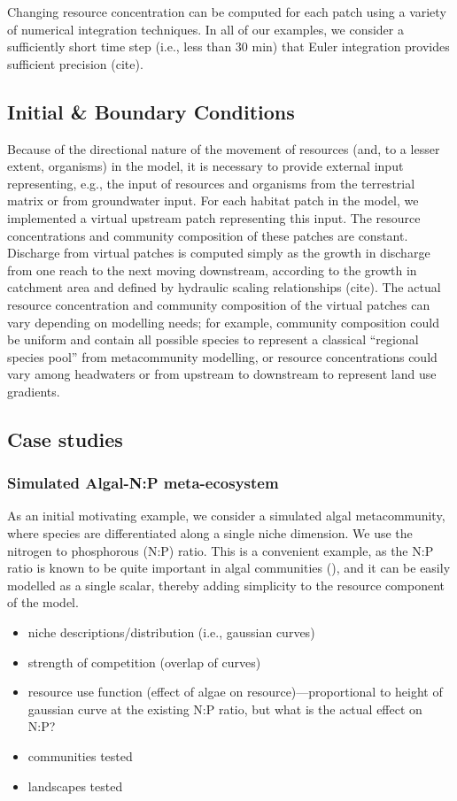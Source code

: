 Changing resource concentration can be computed for each patch using a variety of numerical integration techniques.
In all of our examples, we consider a sufficiently short time step (i.e., less than 30 min) that Euler integration provides sufficient precision (cite).

\subsection{Initial \& Boundary Conditions} \label{ss:initial-boundary}

Because of the directional nature of the movement of resources (and, to a lesser extent, organisms) in the model, it is necessary to provide external input representing, e.g., the input of resources and organisms from the terrestrial matrix or from groundwater input.
For each habitat patch in the model, we implemented a virtual upstream patch representing this input.
The resource concentrations and community composition of these patches are constant.
Discharge from virtual patches is computed simply as the growth in discharge from one reach to the next moving downstream, according to the growth in catchment area and defined by hydraulic scaling relationships (cite).
The actual resource concentration and community composition of the virtual patches can vary depending on modelling needs; for example, community composition could be uniform and contain all possible species to represent a classical “regional species pool” from metacommunity modelling, or resource concentrations could vary among headwaters or from upstream to downstream to represent land use gradients.


\subsection{Case studies}

\subsubsection{Simulated Algal-N:P meta-ecosystem}
As an initial motivating example, we consider a simulated algal metacommunity, where species are differentiated along a single niche dimension.
We use the nitrogen to phosphorous (N:P) ratio.
This is a convenient example, as the N:P ratio is known to be quite important in algal communities (), and it can be easily modelled as a single scalar, thereby adding simplicity to the resource component of the model.	

\begin{itemize}
	\item niche descriptions/distribution (i.e., gaussian curves)
	\item strength of competition (overlap of curves)
	\item resource use function (effect of algae on resource)---proportional to height of gaussian curve at the existing N:P ratio, but what is the actual effect on N:P?
	\item communities tested
	\item landscapes tested 
\end{itemize}

